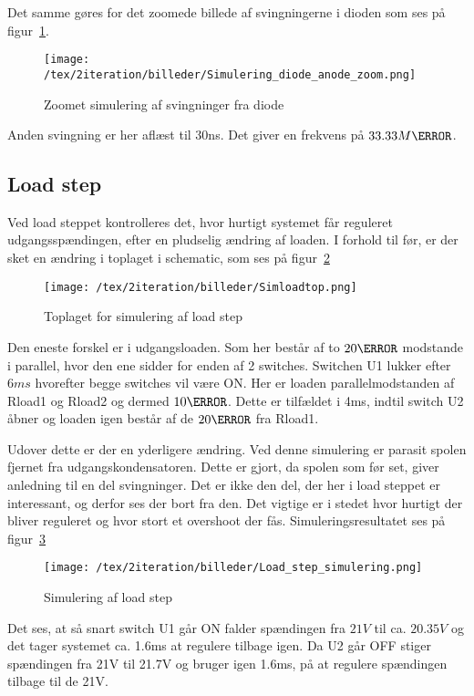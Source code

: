 \noindent Det samme gøres for det zoomede billede af svingningerne i dioden som ses på figur~\ref{fig: simdiodezoom}. 
\begin{figure}[H]
	\center
	\texttt{[image: /tex/2iteration/billeder/Simulering\_diode\_anode\_zoom.png]}
	\caption{Zoomet simulering af svingninger fra diode}
	\label{fig: simdiodezoom}
\end{figure}
\noindent Anden svingning er her aflæst til 30ns. Det giver en frekvens på $33.33M\hertz$.

\subsection{Load step} \label{loadstep2ite}
Ved load steppet kontrolleres det, hvor hurtigt systemet får reguleret udgangsspændingen, efter en pludselig ændring af loaden. I forhold til før, er der sket en ændring i toplaget i schematic, som ses på figur~\ref{fig: simloadtop}  
\begin{figure}[H]
	\center
	\texttt{[image: /tex/2iteration/billeder/Simloadtop.png]}
	\caption{Toplaget for simulering af load step}
	\label{fig: simloadtop}
\end{figure}
Den eneste forskel er i udgangsloaden. Som her består af to $20\ohm$ modstande i parallel, hvor den ene sidder for enden af 2 switches. Switchen U1 lukker efter $6ms$ hvorefter begge switches vil være ON. Her er loaden parallelmodstanden af Rload1 og Rload2 og dermed $10\ohm$. Dette er tilfældet i 4ms, indtil switch U2 åbner og loaden igen består af de $20\ohm$ fra Rload1.

Udover dette er der en yderligere ændring. Ved denne simulering er parasit spolen fjernet fra udgangskondensatoren. Dette er gjort, da spolen som før set, giver anledning til en del svingninger. Det er ikke den del, der her i load steppet er interessant, og derfor ses der bort fra den. Det vigtige er i stedet hvor hurtigt der bliver reguleret og hvor stort et overshoot der fås. Simuleringsresultatet ses på figur~\ref{fig: simloadstep} 

\begin{figure}[H]
	\center
	\texttt{[image: /tex/2iteration/billeder/Load\_step\_simulering.png]}
	\caption{Simulering af load step}
	\label{fig: simloadstep}
\end{figure}

Det ses, at så snart switch U1 går ON falder spændingen fra $21V$ til ca. $20.35V$ og det tager systemet ca. 1.6ms at regulere tilbage igen. Da U2 går OFF stiger spændingen fra 21V til 21.7V og bruger igen 1.6ms, på at regulere spændingen tilbage til de 21V. 

